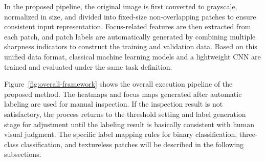 \par In the proposed pipeline, the original image is first converted to
grayscale, normalized in size, and divided into fixed-size non-overlapping
patches to ensure consistent input representation. Focus-related features are
then extracted from each patch, and patch labels are automatically generated by
combining multiple sharpness indicators to construct the training and validation
data. Based on this unified data format, classical machine learning models and a
lightweight CNN are trained and evaluated under the same task definition.

\par Figure~\ref{fig:overall-framework} shows the overall execution pipeline of
the proposed method. The heatmaps and focus maps generated after automatic
labeling are used for manual inspection. If the inspection result is not
satisfactory, the process returns to the threshold setting and label generation
stage for adjustment until the labeling result is basically consistent with
human visual judgment. The specific label mapping rules for binary
classification, three-class classification, and textureless patches will be
described in the following subsections.

